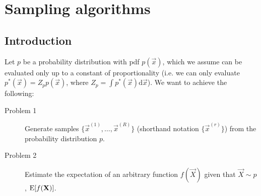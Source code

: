 \chapter{Sampling algorithms}
\section{Introduction}
    Let $p$ be a probability distribution with pdf $p(\vec x)$, which we assume can be evaluated only up to a constant of proportionality (i.e. we can only evaluate $p^\ast(\vec x) = Z_p p(\vec x)$, where $Z_p = \int p^\ast(\vec x)\mathrm d\vec x$). We want to achieve the following:
    \begin{description}
        \item[Problem 1] Generate samples $\{\vec x^{(1)}, \dotsc, \vec x^{(R)}\}$ (shorthand notation $\{\vec x^{(r)}\}$) from the probability distribution $p$.
        \item[Problem 2] Estimate the expectation of an arbitrary function $f(\vec X)$ given that $\vec X \sim p$, $\operatorname{\mathrm{E}} [f(\boldsymbol{\mathbf{X}})]$. 
    \end{description}

